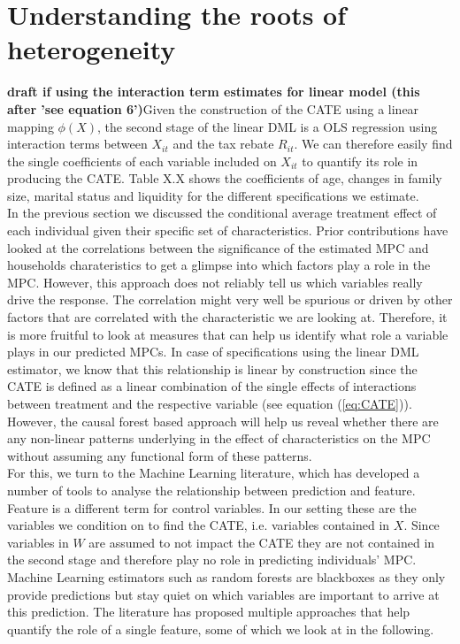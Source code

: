 \section{Understanding the roots of heterogeneity} \label{sec:roots_of_heterogeneity}
\textbf{draft if using the interaction term estimates for linear model (this after 'see equation 6')}Given the construction of the CATE using a linear mapping $\phi(X)$, the second stage of the linear DML is a OLS regression using interaction terms between $X_{it}$ and the tax rebate $R_{it}$. We can therefore easily find the single coefficients of each variable included on $X_{it}$ to quantify its role in  producing the CATE. Table X.X shows the coefficients of age, changes in family size, marital status and liquidity for the different specifications we estimate. \\
In the previous section we discussed the conditional average treatment effect of each individual given their specific set of characteristics. Prior contributions have looked at the correlations between the significance of the estimated MPC and households charateristics to get a glimpse into which factors play a role in the MPC. However, this approach does not reliably tell us which variables really drive the response. The correlation might very well be spurious or driven by other factors that are correlated with the characteristic we are looking at. Therefore, it is more fruitful to look at measures that can help us identify what role a variable plays in our predicted MPCs. In case of specifications using the linear DML estimator, we know that this relationship is linear by construction since the CATE is defined as a linear combination of the single effects of interactions between treatment and the respective variable (see equation (\ref{eq:CATE})). However, the causal forest based approach will help us reveal whether there are any non-linear patterns underlying in the effect of characteristics on the MPC without assuming any functional form of these patterns. \\
For this, we turn to the Machine Learning literature, which has developed a number of tools to analyse the relationship between prediction and feature. Feature is a different term for control variables. In our setting these are the variables we condition on to find the CATE, i.e. variables contained in $X$. Since variables in $W$ are assumed to not impact the CATE they are not contained in the second stage and therefore play no role in predicting individuals' MPC. Machine Learning estimators such as random forests are blackboxes as they only provide predictions but stay quiet on which variables are important to arrive at this prediction. The literature has proposed multiple approaches that help quantify the role of a single feature, some of which we look at in the following. 

